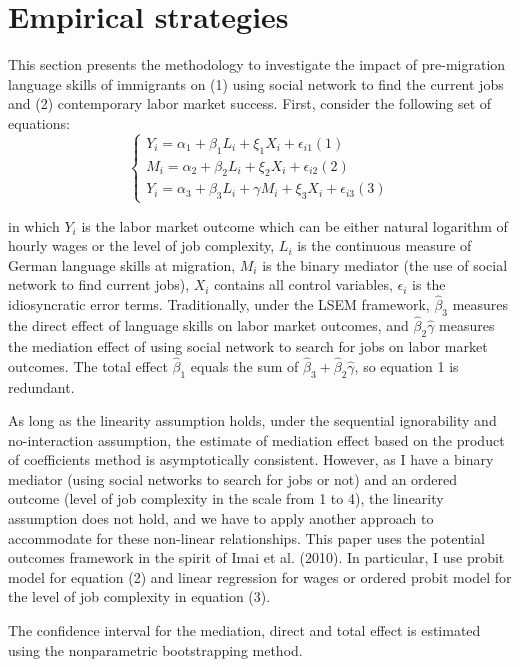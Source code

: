 \documentclass[12pt,a4paper]{article}
\begin{document}
\section{Empirical strategies}

This section presents the methodology to investigate the impact of pre-migration language skills of immigrants on (1) using social network to find the current jobs and (2) contemporary labor market success. First, consider the following set of equations:
$$
\begin{cases} Y_{i} = \alpha_{1} + \beta_{1}L_{i} + \xi_{1}X_{i} + \epsilon_{i1} (1) \\ M_{i} = \alpha_{2} + \beta_{2}L_{i} + \xi_{2}X_{i} + \epsilon_{i2} (2) \\ Y_{i} = \alpha_{3} + \beta_{3}L_{i} + \gamma M_{i} + \xi_{3}X_{i} + \epsilon_{i3} (3)
\end{cases}
$$

in which $Y_{i}$ is the labor market outcome which can be either natural logarithm of hourly wages or the level of job complexity, $L_{i}$ is the continuous measure of German language skills at migration, $M_{i}$ is the binary mediator (the use of social network to find current jobs), $X_{i}$ contains all control variables, $\epsilon_{i}$ is the idiosyncratic error terms. Traditionally, under the LSEM framework, $\hat \beta_{3}$ measures the direct effect of language skills on labor market outcomes, and $\hat \beta_{2}\hat \gamma$ measures the mediation effect of using social network to search for jobs on labor market outcomes. The total effect $\hat \beta_{1}$ equals the sum of $\hat \beta_{3} + \hat \beta_{2}\hat \gamma$, so equation 1 is redundant. 

As long as the linearity assumption holds, under the sequential ignorability and no-interaction assumption, the estimate of mediation effect based on the product of coefficients method is asymptotically consistent. However, as I have a binary mediator (using social networks to search for jobs or not) and an ordered outcome (level of job complexity in the scale from 1 to 4), the linearity assumption does not hold, and we have to apply another approach to accommodate for these non-linear relationships. This paper uses the potential outcomes framework in the spirit of Imai et al. (2010). In particular, I use probit model for equation (2) and linear regression for wages or ordered probit model for the level of job complexity in equation (3).

The confidence interval for the mediation, direct and total effect is estimated using the nonparametric bootstrapping method.
\end{document}
